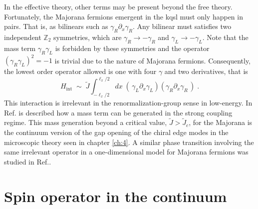 In the effective theory, other terms may be present beyond the free theory. Fortunately, the Majorana fermions emergent in the \acrshort{kqsl} must only happen in pairs. That is, as bilinears such as $\gamma_R \partial_x \gamma_R$. Any bilinear must satisfies two independent $\mathbb{Z}_2$ symmetries, which are $\gamma_R \to - \gamma_R$ and $\gamma_L \to - \gamma_L$. Note that the mass term $\gamma_R \gamma_L$ is forbidden by these symmetries and the operator  $(\gamma_R \gamma_L)^2 = -1$ is trivial due to the nature of Majorana fermions. Consequently, the lowest order operator allowed is one with four $\gamma$ and two derivatives, that is
\begin{equation}
    H_{\text{int}} \; \sim  \; \tilde{J}  \int_{-\ell_x/2}^{\ell_x/2} dx \; \left( \, \gamma_{L} \partial_x \gamma_{L} \right) \left( \gamma_{R}  \partial_x  \gamma_{R} \, \right)  \; .
\end{equation}
This interaction is irrelevant in the renormalization-group sense in low-energy. In Ref.\cite{Aasen_2020} is described how a mass term can be generated in the strong coupling regime. This mass generation beyond a critical value, $\tilde{J} > \tilde{J}_c$, for the Majorana is the continuum version of the gap opening of the chiral edge modes in the microscopic theory seen in chapter \ref{ch:4}. A similar phase transition involving the same irrelevant operator in a one-dimensional model for Majorana fermions was studied in Ref.\cite{Rahmani_Affleck_2015}.

\section{Spin operator in the continuum}

